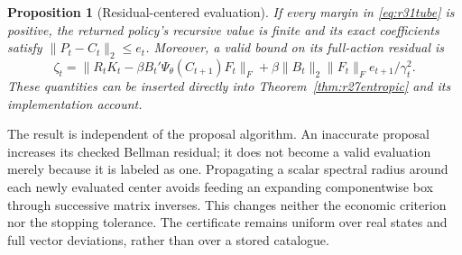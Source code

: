 \documentclass[ecta,nameyear,draft]{econsocart}
\newtheorem{proposition}[theorem]{Proposition}
\theoremstyle{definition}
\theoremstyle{remark}
\begin{document}
\begin{proposition}[Residual-centered evaluation]\label{prop:r31tube}
If every margin in \eqref{eq:r31tube} is positive, the returned policy's
recursive value is finite and its exact coefficients satisfy
$\|P_t-C_t\|_2\leq e_t$. Moreover, a valid bound on its full-action residual is
\begin{equation}
 \zeta_t=
 \|R_tK_t-\beta B_t'\Psi_\theta(C_{t+1})F_t\|_F
 +\beta\|B_t\|_2\|F_t\|_F e_{t+1}/\gamma_t^2.
 \label{eq:r31defect}
\end{equation}
These quantities can be inserted directly into
Theorem~\ref{thm:r27entropic} and its implementation account.
\end{proposition}

The result is independent of the proposal algorithm. An inaccurate proposal
increases its checked Bellman residual; it does not become a valid evaluation
merely because it is labeled as one. Propagating a scalar spectral radius
around each newly evaluated center avoids feeding an expanding componentwise
box through successive matrix inverses. This changes neither the economic
criterion nor the stopping tolerance. The certificate remains uniform over
real states and full vector deviations, rather than over a stored catalogue.
\end{document}
